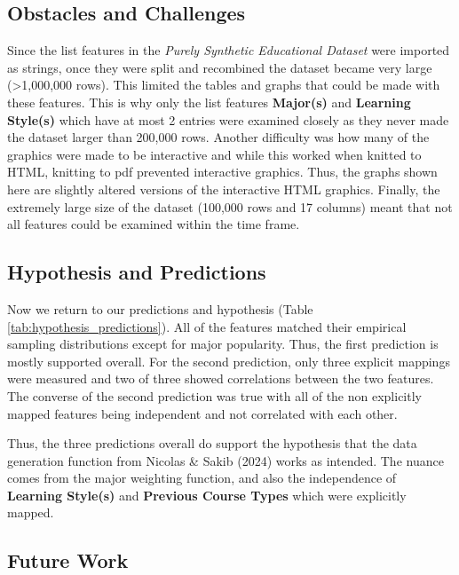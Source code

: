 \documentclass{article}
\begin{document}
\subsection{Obstacles and Challenges}\label{obstacles-and-challenges}

\label{sec:obstacles_challenges}

Since the list features in the \emph{Purely Synthetic Educational Dataset} were imported as strings, once they were split and recombined the dataset became very large (\textgreater1,000,000 rows). This limited the tables and graphs that could be made with these features. This is why only the list features \textbf{Major(s)} and \textbf{Learning Style(s)} which have at most 2 entries were examined closely as they never made the dataset larger than 200,000 rows. Another difficulty was how many of the graphics were made to be interactive and while this worked when knitted to HTML, knitting to pdf prevented interactive graphics. Thus, the graphs shown here are slightly altered versions of the interactive HTML graphics. Finally, the extremely large size of the dataset (100,000 rows and 17 columns) meant that not all features could be examined within the time frame.

\subsection{Hypothesis and Predictions}\label{hypothesis-and-predictions}

\label{sec:hypothesis_predictions}

Now we return to our predictions and hypothesis (Table \ref{tab:hypothesis_predictions}). All of the features matched their empirical sampling distributions except for major popularity. Thus, the first prediction is mostly supported overall. For the second prediction, only three explicit mappings were measured and two of three showed correlations between the two features. The converse of the second prediction was true with all of the non explicitly mapped features being independent and not correlated with each other.

Thus, the three predictions overall do support the hypothesis that the data generation function from Nicolas \& Sakib (2024) works as intended. The nuance comes from the major weighting function, and also the independence of \textbf{Learning Style(s)} and \textbf{Previous Course Types} which were explicitly mapped.

\subsection{Future Work}\label{future-work}
\end{document}
